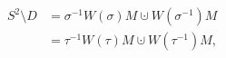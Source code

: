 \documentclass[preview]{standalone}
\begin{document}
\begin{align*}
S^2 \setminus D &= \sigma^{-1} W(\sigma) M \cupdot W(\sigma^{-1}) M \\ &= \tau^{-1} W(\tau) M \cupdot W(\tau^{-1}) M,
\end{align*}
\end{document}
